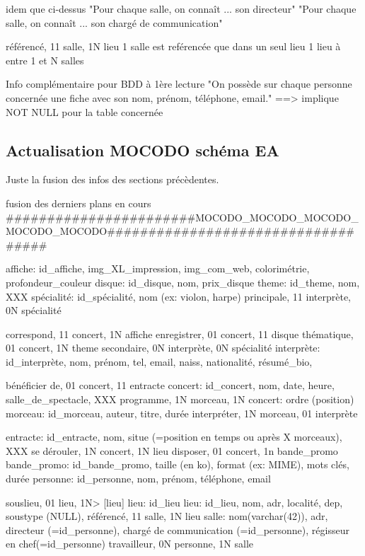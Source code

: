 \documentclass[12pt,a4paper]{article}
\begin{document}
{idem que ci-dessus
"Pour chaque salle, on connaît ... son directeur"
"Pour chaque salle, on connaît ... son chargé de communication"



référencé, 11 salle, 1N lieu
1 salle est reférencée que dans un seul lieu
1 lieu à entre 1 et N salles



Info complémentaire pour BDD à 1ère lecture
"On possède sur chaque personne concernée une fiche avec son nom, prénom, téléphone, email."
==> implique NOT NULL pour la table concernée





\subsection{Actualisation MOCODO schéma EA}
Juste la fusion des infos des sections précèdentes.

fusion des derniers plans en cours
#######################MOCODO_MOCODO_MOCODO_MOCODO_MOCODO###################################

affiche: id_affiche, img_XL_impression, img_com_web, colorimétrie, profondeur_couleur
disque: id_disque, nom, prix_disque
theme: id_theme, nom, XXX
spécialité: id_spécialité, nom (ex: violon, harpe)
principale, 11 interprète, 0N spécialité

correspond, 11 concert, 1N affiche
enregistrer, 01 concert, 11 disque
thématique, 01 concert, 1N theme
secondaire, 0N interprète, 0N spécialité
interprète: id_interprète, nom, prénom, tel, email, naiss, nationalité, résumé_bio,

bénéficier de, 01 concert, 11 entracte
concert: id_concert, nom, date, heure, salle_de_spectacle, XXX
programme, 1N morceau, 1N concert: ordre (position)
morceau: id_morceau, auteur, titre, durée
interpréter, 1N morceau, 01 interprète

entracte: id_entracte, nom, situe (=position en temps ou après X morceaux), XXX
se dérouler, 1N concert, 1N lieu
disposer, 01 concert, 1n bande_promo
bande_promo: id_bande_promo, taille (en ko), format (ex: MIME), mots clés, durée
personne: id_personne, nom, prénom, téléphone, email

souslieu, 01 lieu,   1N> [lieu] lieu: id_lieu
lieu: id_lieu, nom, adr, localité, dep, soustype (NULL),
référencé, 11 salle, 1N lieu
salle: nom(varchar(42)), adr, directeur (=id_personne), chargé de communication (=id_personne), régisseur en chef(=id_personne)
travailleur, 0N personne, 1N salle

}
\end{document}
